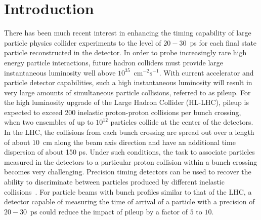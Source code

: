 \section{Introduction} 

There has been much recent interest in enhancing the timing capability of large 
particle physics collider experiments to the level of $20-30$~ps for each final state particle
reconstructed in the detector. In order to probe increasingly rare high energy particle 
interactions, future hadron colliders must provide large 
instantaneous luminosity well above $10^{35}$~$\mathrm{cm}^{-2}\mathrm{s}^{-1}$.
With current accelerator and particle detector capabilities, such a high 
instantaneous luminosity will result in very large amounts
of simultaneous particle collisions, referred to as pileup. 
For the high luminosity upgrade of the Large Hadron Collider (HL-LHC), pileup is expected to 
exceed 200 inelastic proton-proton collisions per bunch crossing, when two ensembles
of up to $10^{12}$ particles collide at the center of the detectors.
In the LHC, the collisions from each bunch crossing are spread out over a length of about $10$~cm 
along the beam axis direction and have an additional time dispersion of about 150 ps.
Under such conditions, the task to associate particles measured in the detectors to a particular 
proton collision within a bunch crossing becomes very challenging. 
Precision timing detectors can be used to recover the ability to 
discriminate between particles produced by different inelastic collisions~\cite{adielba}.
For particle beams with bunch profiles similar to that of the LHC, a detector capable of measuring
the time of arrival of a particle with a precision of $20-30$~ps could reduce the impact of
pileup by a factor of $5$ to $10$. 

